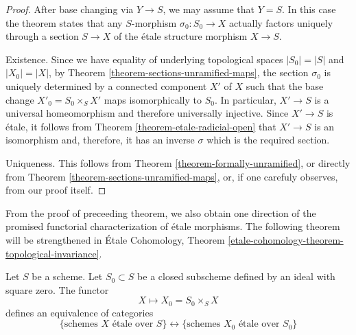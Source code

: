 \begin{proof}
After base changing via $Y \to S$, we may assume that $Y = S$.
In this case the theorem states that any $S$-morphism $\sigma_0 : S_0 \to X$
actually factors uniquely through a section $S \to X$ of the
\'etale structure morphism $X \to S$.

\medskip\noindent
Existence. Since we have equality of underlying topological spaces
$|S_0| = |S|$ and $|X_0| = |X|$,
by Theorem \ref{theorem-sections-unramified-maps},
the section $\sigma_0$ is uniquely determined by a connected component
$X'$ of $X$ such that the base change
$X'_0 = S_0 \times_S X'$ maps isomorphically to $S_0$.
In particular, $X' \to S$ is a universal homeomorphism
and therefore universally injective. Since $X' \to S$ is \'etale, it
follows from Theorem \ref{theorem-etale-radicial-open}
that $X' \to S$ is an isomorphism and, therefore, it has
an inverse $\sigma$ which is the required section.

\medskip\noindent
Uniqueness. This follows from Theorem
\ref{theorem-formally-unramified}, or directly from Theorem
\ref{theorem-sections-unramified-maps}, or, if one carefuly observes,
from our proof itself.
\end{proof}

\noindent
From the proof of preceeding theorem, we also obtain one direction of the
promised functorial characterization of \'etale morphisms. The following
theorem will be strengthened in
\'Etale Cohomology,
Theorem \ref{etale-cohomology-theorem-topological-invariance}.

\begin{theorem}
\label{theorem-remarkable-equivalence}
Let $S$ be a scheme.
Let $S_0 \subset S$ be a closed subscheme defined by an ideal
with square zero.
The functor
$$
X \longmapsto X_0 = S_0 \times_S X
$$
defines an equivalence of categories
$$
\{
\text{schemes }X\text{ \'etale over }S
\}
\leftrightarrow
\{
\text{schemes }X_0\text{ \'etale over }S_0
\}
$$
\end{theorem}

